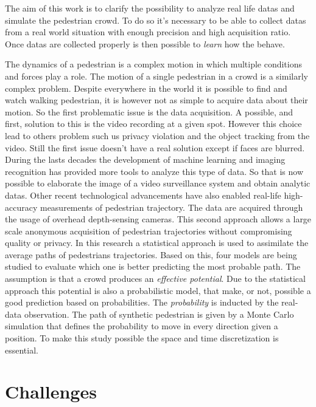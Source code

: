 \documentclass[class=article, crop=false]{standalone}
\begin{document}
The aim of this work is to clarify the possibility to analyze real life datas and simulate the pedestrian crowd.
To do so it's necessary to be able to collect datas from a real world situation with enough precision and high acquisition ratio.
Once datas are collected properly is then possible to \emph{learn} how the behave.

The dynamics of a pedestrian is a complex motion in which multiple conditions and forces play a role.
The motion of a single pedestrian in a crowd is a similarly complex problem.
Despite everywhere in the world it is possible to find and watch walking pedestrian, it is however not as simple to acquire data about their motion.
So the first problematic issue is the data acquisition.
A possible, and first, solution to this is the video recording at a given spot.
However this choice lead to others problem such us privacy violation and the object tracking from the video.
Still the first issue doesn't have a real solution except if faces are blurred.
During the lasts decades the development of machine learning and imaging recognition has provided more tools to analyze this type of data.
So that is now possible to elaborate the image of a video surveillance system and obtain analytic datas.
Other recent technological advancements have also enabled real-life high-accuracy measurements of pedestrian trajectory.
The data are acquired through the usage of overhead depth-sensing cameras.
This second approach allows a large scale anonymous acquisition of pedestrian trajectories without compromising quality or privacy.
In this research a statistical approach is used to assimilate the average paths of pedestrians trajectories.
Based on this, four models are being studied to evaluate which one is better predicting the most probable path.
The assumption is that a crowd produces an \emph{effective potential}. 
Due to the statistical approach this potential is also a probabilistic model, that make, or not, possible a good prediction based on probabilities.
The \emph{probability} is inducted by the real-data observation.
The path of synthetic pedestrian is given by a Monte Carlo simulation that defines the probability to move in every direction given a position.
To make this study possible the space and time discretization is essential.



\section{Challenges}
\end{document}

